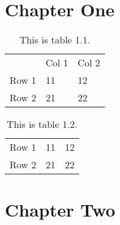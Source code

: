 \documentclass[]{book}
\begin{document}
\makeatletter
\def\@chapter[#1]#2{\ifnum \c@secnumdepth >\m@ne
                       \if@mainmatter
                         \refstepcounter{chapter}%
                         \typeout{\@chapapp\space\thechapter.}%
                         \addcontentsline{toc}{chapter}%
                                   {\protect\numberline{\thechapter}#1}%
                       \else
                         \addcontentsline{toc}{chapter}{#1}%
                       \fi
                    \else
                      \addcontentsline{toc}{chapter}{#1}%
                    \fi
                    \chaptermark{#1}%
                    \if@twocolumn
                      \@topnewpage[\@makechapterhead{#2}]%
                    \else
                      \@makechapterhead{#2}%
                      \@afterheading
                    \fi}
\makeatother

\tableofcontents

\begingroup
\let\cleardoublepage\relax
{}
\listoftables
{}
\listoffigures
\endgroup


\chapter{Chapter One}


\begin{table}[htbp] 
  \centering
    \begin{tabular}{lll}
    & Col 1 & Col 2 \\
    Row 1 & 11 & 12 \\
    Row 2 & 21 & 22 \\
    \end{tabular}
  \caption{This is table 1.1.}
\end{table}

\begin{table}[htbp] 
  \centering
    \begin{tabular}{lll}
    Row 1 & 11 & 12 \\
    Row 2 & 21 & 22 \\
    \end{tabular}
  \caption{This is table 1.2.}
\end{table}


\chapter{Chapter Two}
\end{document}
